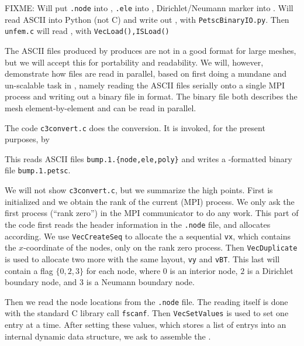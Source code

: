 FIXME: Will put \texttt{.node} into \pVec, \texttt{.ele} into \pIS, Dirichlet/Neumann marker into \pIS.  Will read ASCII into Python (not C) and write out \pVec, \pIS with \texttt{PetscBinaryIO.py}.  Then \texttt{unfem.c} will read \pVec, \pIS with \texttt{VecLoad(),ISLoad()}

The ASCII files produced by \Triangle produces are not in a good format for large meshes, but we will accept this for portability and readability.  We will, however, demonstrate how files are read in parallel, based on first doing a mundane and un-scalable task in \PETSc, namely reading the ASCII \Triangle files serially onto a single MPI process and writing out a binary file in \PETSc format.  The binary file both describes the mesh element-by-element and can be read in parallel.

The code \texttt{c3convert.c} does the conversion.  It is invoked, for the present purposes, by
This reads ASCII files \texttt{bump.1.\{node,ele,poly\}} and writes a \PETSc-formatted binary file \texttt{bump.1.petsc}.

We will not show \texttt{c3convert.c}, but we summarize the high points.  First \PETSc is initialized and we obtain the rank of the current (MPI) process.  We only ask the first process (``rank zero'') in the MPI communicator to do any work.  This part of the code first reads the header information in the \texttt{.node} file, and allocates \PETSc \pVecs according.  We use \texttt{VecCreateSeq} to allocate the a sequential \pVec \texttt{vx}, which contains the $x$-coordinate of the nodes, only on the rank zero process.  Then \texttt{VecDuplicate} is used to allocate two more \pVecs with the same layout, \texttt{vy} and \texttt{vBT}.  This last \pVec will contain a flag $\{0,2,3\}$ for each node, where $0$ is an interior node, $2$ is a Dirichlet boundary node, and $3$ is a Neumann boundary node.

Then we read the node locations from the \texttt{.node} file.  The reading itself is done with the standard C library call \texttt{fscanf}.  Then \texttt{VecSetValues} is used to set one entry at a time.  After setting these values, which stores a list of entrys into an internal \PETSc dynamic data structure, we ask \PETSc to assemble the \pVecs.

